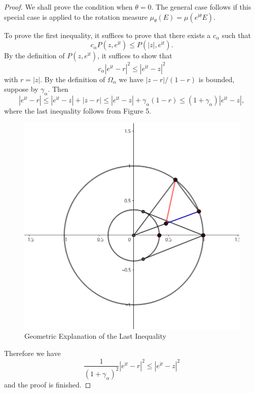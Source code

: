 \begin{proof}
We shall prove the condition when $\theta=0$. The general case follows if this special case is applied to the rotation measure $\mu_\theta(E)=\mu(e^{\mathrm{i}\theta}E)$.\par
To prove the first inequality, it suffices to prove that there exists a $c_\alpha$ such that 
$$
c_{\alpha}P\left( z,e^{\mathrm{i}t} \right) \le P\left( \left| z \right|,e^{\mathrm{i}t} \right) .
$$
By the definition of $P(z,e^{\mathrm{i}t})$, it suffices to show that 
$$
c_{\alpha}\left| e^{\mathrm{i}t}-r \right|^2\le \left| e^{\mathrm{i}t}-z \right|^2
$$
with $r=|z|$. By the definition of $\Omega_\alpha$ we have $|z-r|/(1-r)$ is bounded, suppose by $\gamma_\alpha$. Then 
$$
\left| e^{\mathrm{i}t}-r \right|\le \left| e^{\mathrm{i}t}-z \right|+\left| z-r \right|\le \left| e^{\mathrm{i}t}-z \right|+\gamma _{\alpha}\left( 1-r \right) \le \left( 1+\gamma _{\alpha} \right) \left| e^{\mathrm{i}t}-z \right|,
$$
where the last inequality follows from Figure 5. 
\begin{figure}[htbp]
    \center
    \includegraphics[scale=0.29]{img/proof of an Inequality.png}
    \caption{Geometric Explanation of the Last Inequality}
\end{figure}
Therefore we have 
$$
\frac{1}{\left( 1+\gamma _{\alpha} \right) ^2}\left| e^{\mathrm{i}t}-r \right|^2\le \left| e^{\mathrm{i}t}-z \right|^2
$$
and the proof is finished.\par

\end{proof}
